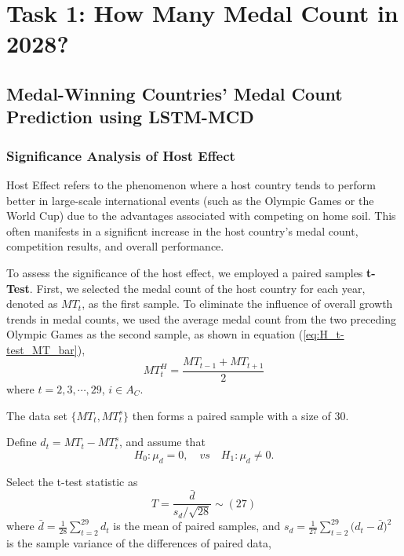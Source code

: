 \documentclass{mcmthesis}
\begin{document}
	\section{Task 1: How Many Medal Count in 2028? }
	\subsection{Medal-Winning Countries' Medal Count Prediction using LSTM-MCD}
	
	\subsubsection{Significance Analysis of Host Effect}
	
Host Effect refers to the phenomenon where a host country tends to perform better in large-scale international events (such as the Olympic Games or the World Cup) due to the advantages associated with competing on home soil. This often manifests in a significnt increase in the host country's medal count, competition results, and overall performance.

	
	To assess the significance of the host effect, we employed a paired samples  \textbf{t-Test}. First, we selected the medal count of the host country for each year, denoted as $MT_{t}$, as the first sample. To eliminate the influence of overall growth trends in medal counts, we used the average medal count from the two preceding Olympic Games as the second sample, as shown in equation (\ref{eq:H_t-test_MT_bar}),
	\begin{equation*}
		MT^H_{t}=\frac{ MT_{t-1} + MT_{t+1} }{2}
		\label{eq:H_t-test_MT_bar}
	\end{equation*}
	where $t=2,3,\cdots,29$, $i\in A_{C}$. 
	
	The data set $\{MT_{t},MT^s_{t}\}$ then forms a paired sample with a size of 30. 
	
	Define $d_t= MT_{t} - MT^s_{t}$, and assume that
	\begin{equation*}
		H_0: \mu_d=0, \quad vs \quad H_1:  \mu_d \ne 0.
	\end{equation*}
	
	Select the t-test statistic as
	\begin{equation*}
		T=\frac{ \bar{d} }{ s_d\slash \sqrt{28} } \sim (27)
	\end{equation*}
	where $\bar{d}=\frac{1}{28} \sum_{t=2}^{29} d_t$ is the mean of paired samples, 
	and $ s_d = \frac{1}{27} \sum_{t=2}^{29}\big( d_t - \bar{d} \big)^2 $ is the sample variance of the differences of paired data, 
	
\end{document}
